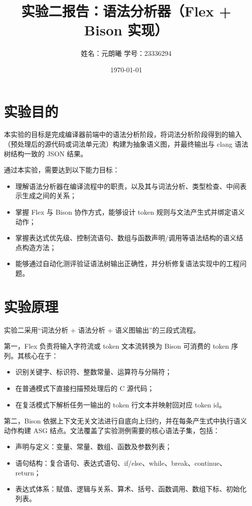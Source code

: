 \documentclass[UTF8,a4paper,12pt]{ctexart}
\title{实验二报告：语法分析器（Flex + Bison 实现）}
\author{姓名：元朗曦 \quad 学号：23336294}
\date{\today}
\begin{document}
\maketitle

\section{实验目的}
本实验的目标是完成编译器前端中的语法分析阶段，将词法分析阶段得到的输入（预处理后的源代码或词法单元流）构建为抽象语义图，并最终输出与 clang 语法树结构一致的 JSON 结果。

通过本实验，需要达到以下能力目标：
\begin{itemize}
  \item 理解语法分析器在编译流程中的职责，以及其与词法分析、类型检查、中间表示生成之间的关系；
  \item 掌握 Flex 与 Bison 协作方式，能够设计 token 规则与文法产生式并绑定语义动作；
  \item 掌握表达式优先级、控制流语句、数组与函数声明/调用等语法结构的语义结点构造方法；
  \item 能够通过自动化测评验证语法树输出正确性，并分析修复语法实现中的工程问题。
\end{itemize}

\section{实验原理}
实验二采用“词法分析 + 语法分析 + 语义图输出”的三段式流程。

第一，Flex 负责将输入字符流或 token 文本流转换为 Bison 可消费的 token 序列。其核心在于：
\begin{itemize}
  \item 识别关键字、标识符、整数常量、运算符与分隔符；
  \item 在普通模式下直接扫描预处理后的 C 源代码；
  \item 在复活模式下解析任务一输出的 token 行文本并映射回对应 token id。
\end{itemize}

第二，Bison 依据上下文无关文法进行自底向上归约，并在每条产生式中执行语义动作构建 ASG 结点。文法覆盖了实验测例需要的核心语法子集，包括：
\begin{itemize}
  \item 声明与定义：变量、常量、数组、函数及参数列表；
  \item 语句结构：复合语句、表达式语句、if/else、while、break、continue、return；
  \item 表达式体系：赋值、逻辑与关系、算术、括号、函数调用、数组下标、初始化列表。
\end{itemize}
\end{document}
